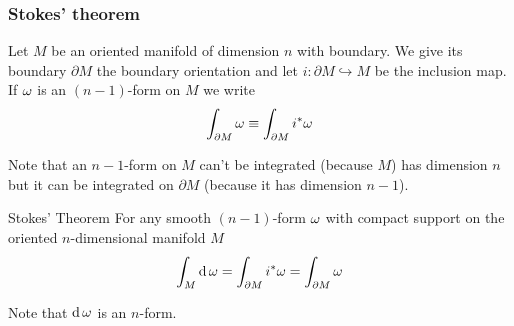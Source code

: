\subsubsection{Stokes' theorem}

Let \(M\) be an oriented manifold of dimension \(n\) with boundary.
We give its boundary \(\partial M\) the boundary orientation and let \(i \colon \partial M \hookrightarrow M \) be the inclusion map. 
If \(\omega\) is an \((n-1)\)-form on \(M\) we write 
\[
    \int_{\partial M} \omega \equiv \int_{\partial M } i^* \omega    
\]

Note that an \(n-1\)-form on \(M\) can't be integrated (because \(M\)) has dimension \(n\) but it can be integrated on \(\partial M\) (because it has dimension \(n-1\)).

\begin{definition}{Stokes' Theorem}
    For any smooth \((n-1)\)-form \(\omega\) with compact support on the oriented \(n\)-dimensional manifold \(M\)
    \[
        \int_M \operatorname{d} \omega = \int_{\partial M} i^* \omega = \int_{\partial M} \omega
    \]
\end{definition}
Note that \(\operatorname{d} \omega\) is an \(n\)-form.
